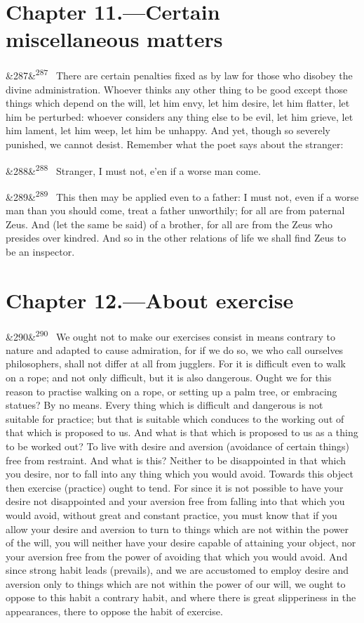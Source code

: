 \documentclass[12pt]{article}
\newcommand{\para}[1][]{\par\noindent\ifx&#1&\else\textsuperscript{\footnotesize #1}~\fi}
\begin{document}
\section*{Chapter 11.---Certain miscellaneous matters}

\para[287] There are certain penalties fixed as by law for those who disobey the divine administration. Whoever thinks any other thing to be good except those things which depend on the will, let him envy, let him desire, let him flatter, let him be perturbed: whoever considers any thing else to be evil, let him grieve, let him lament, let him weep, let him be unhappy. And yet, though so severely punished, we cannot desist. Remember what the poet says about the stranger:

\para[288] Stranger, I must not, e'en if a worse man come.

\para[289] This then may be applied even to a father: I must not, even if a worse man than you should come, treat a father unworthily; for all are from paternal Zeus. And (let the same be said) of a brother, for all are from the Zeus who presides over kindred. And so in the other relations of life we shall find Zeus to be an inspector.

\section*{Chapter 12.---About exercise}

\para[290] We ought not to make our exercises consist in means contrary to nature and adapted to cause admiration, for if we do so, we who call ourselves philosophers, shall not differ at all from jugglers. For it is difficult even to walk on a rope; and not only difficult, but it is also dangerous. Ought we for this reason to practise walking on a rope, or setting up a palm tree, or embracing statues? By no means. Every thing which is difficult and dangerous is not suitable for practice; but that is suitable which conduces to the working out of that which is proposed to us. And what is that which is proposed to us as a thing to be worked out? To live with desire and aversion (avoidance of certain things) free from restraint. And what is this? Neither to be disappointed in that which you desire, nor to fall into any thing which you would avoid. Towards this object then exercise (practice) ought to tend. For since it is not possible to have your desire not disappointed and your aversion free from falling into that which you would avoid, without great and constant practice, you must know that if you allow your desire and aversion to turn to things which are not within the power of the will, you will neither have your desire capable of attaining your object, nor your aversion free from the power of avoiding that which you would avoid. And since strong habit leads (prevails), and we are accustomed to employ desire and aversion only to things which are not within the power of our will, we ought to oppose to this habit a contrary habit, and where there is great slipperiness in the appearances, there to oppose the habit of exercise.
\end{document}
